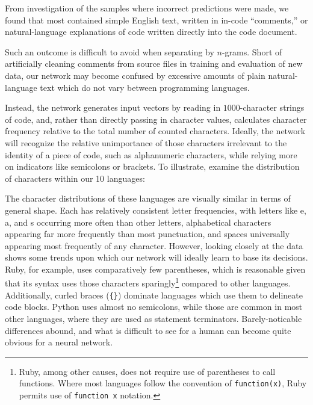 \documentclass{article}
\begin{document}
From investigation of the samples where incorrect predictions were made, we found that most contained simple English text, written in in-code ``comments,'' or natural-language explanations of code written directly into the code document.

Such an outcome is difficult to avoid when separating by $n$-grams. Short of artificially cleaning comments from source files in training and evaluation of new data, our network may become confused by excessive amounts of plain natural-language text which do not vary between programming languages.

Instead, the network generates input vectors by reading in $1000$-character strings of code, and, rather than directly passing in character values, calculates character frequency relative to the total number of counted characters. Ideally, the network will recognize the relative unimportance of those characters irrelevant to the identity of a piece of code, such as alphanumeric characters, while relying more on indicators like semicolons or brackets. To illustrate, examine the distribution of characters within our 10 languages:

\begin{center}
\end{center}
The character distributions of these languages are visually similar in terms of general shape. Each has relatively consistent letter frequencies, with letters like e, a, and s occurring more often than other letters, alphabetical characters appearing far more frequently than most punctuation, and spaces universally appearing most frequently of any character. However, looking closely at the data shows some trends upon which our network will ideally learn to base its decisions. Ruby, for example, uses comparatively few parentheses, which is reasonable given that its syntax uses those characters sparingly\footnote{Ruby, among other causes, does not require use of parentheses to call functions. Where most languages follow the convention of \texttt{function(x)}, Ruby permits use of \texttt{function x} notation.} compared to other languages. Additionally, curled braces (\texttt{\{\}}) dominate languages which use them to delineate code blocks. Python uses almost no semicolons, while those are common in most other languages, where they are used as statement terminators. Barely-noticable differences abound, and what is difficult to see for a human can become quite obvious for a neural network.
\end{document}

